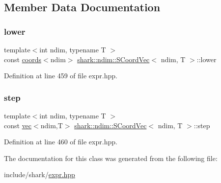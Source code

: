 \subsection{Member Data Documentation}
\hypertarget{classshark_1_1ndim_1_1_s_coord_vec_aec6b26f59abee649139be7a517101d04}{}\label{classshark_1_1ndim_1_1_s_coord_vec_aec6b26f59abee649139be7a517101d04} 
\subsubsection{\texorpdfstring{lower}{lower}}
{\footnotesize\ttfamily template$<$int ndim, typename T $>$ \\
const \hyperlink{structshark_1_1ndim_1_1coords}{coords}$<$ndim$>$ \hyperlink{classshark_1_1ndim_1_1_s_coord_vec}{shark\+::ndim\+::\+S\+Coord\+Vec}$<$ ndim, T $>$\+::lower\hspace{0.3cm}{\ttfamily [private]}}



Definition at line 459 of file expr.\+hpp.

\hypertarget{classshark_1_1ndim_1_1_s_coord_vec_aa2ce747ed08501f5fe6bf4a8c6b25a20}{}\label{classshark_1_1ndim_1_1_s_coord_vec_aa2ce747ed08501f5fe6bf4a8c6b25a20} 
\subsubsection{\texorpdfstring{step}{step}}
{\footnotesize\ttfamily template$<$int ndim, typename T $>$ \\
const \hyperlink{structshark_1_1ndim_1_1vec}{vec}$<$ndim,T$>$ \hyperlink{classshark_1_1ndim_1_1_s_coord_vec}{shark\+::ndim\+::\+S\+Coord\+Vec}$<$ ndim, T $>$\+::step\hspace{0.3cm}{\ttfamily [private]}}



Definition at line 460 of file expr.\+hpp.



The documentation for this class was generated from the following file\+:\begin{DoxyCompactItemize}
\item 
include/shark/\hyperlink{expr_8hpp}{expr.\+hpp}\end{DoxyCompactItemize}
